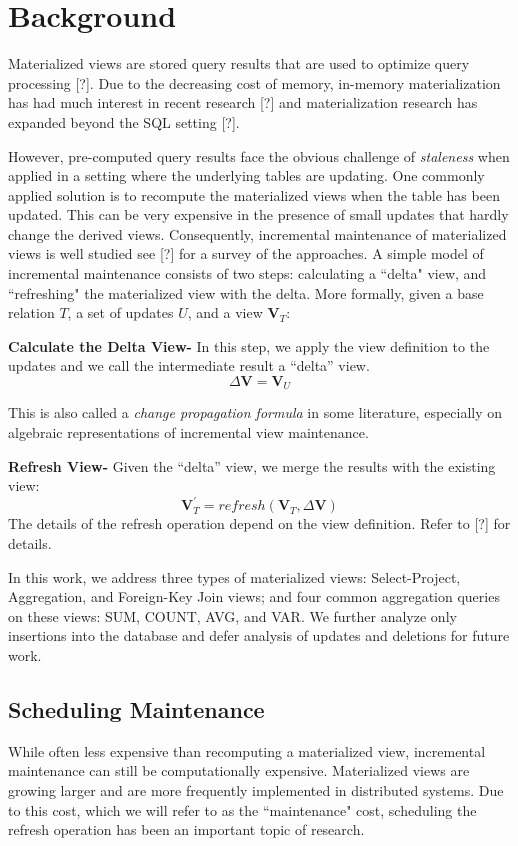 \section{Background}
Materialized views are stored query results that are used 
to optimize query processing [?].
Due to the decreasing cost of memory, in-memory materialization 
has had much interest in recent research [?] and materialization 
research has expanded beyond the SQL setting [?].

However, pre-computed query results face the obvious challenge of \emph{staleness} when applied
in a setting where the underlying tables are updating.
One commonly applied solution is to recompute the materialized views when the table has been updated.
This can be very expensive in the presence of small updates that hardly change the derived views.
Consequently, incremental maintenance of materialized views is well studied see [?]
for a survey of the approaches. 
A simple model of incremental maintenance consists of two steps: calculating a ``delta" view,
and ``refreshing" the materialized view with the delta.
More formally, given a base relation $T$, a set of updates $U$,
and a view $\textbf{V}_{T}$:

\textbf{Calculate the Delta View- }
In this step, we apply the view definition to the updates and we call
the intermediate result a ``delta'' view.
\[
\Delta\textbf{V}=\textbf{V}_{U}
\]

This is also called a \emph{change propagation formula} in some literature,
especially on algebraic representations of incremental view maintenance.

\textbf{Refresh View- }
Given the ``delta'' view, we merge the results with the existing
view:
\[
\textbf{V}_{T}^{'}=refresh(\textbf{V}_{T},\Delta\textbf{V})
\] 
The details of the refresh operation depend on the view definition.
Refer to [?] for details.

In this work, we address three types of materialized views: Select-Project, Aggregation, and
Foreign-Key Join views; and four common aggregation queries on these
views: SUM, COUNT, AVG, and VAR. We further analyze 
only insertions into the database and defer analysis of updates
and deletions for future work.

\subsection{Scheduling Maintenance}
While often less expensive than recomputing a materialized view,
incremental maintenance can still be computationally expensive.
Materialized views are growing larger and are more frequently 
implemented in distributed systems.
Due to this cost, which we will refer to as the ``maintenance" cost, 
scheduling the refresh operation has been an important topic of research.

